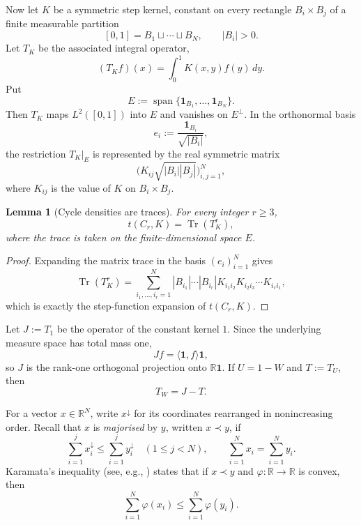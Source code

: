 \documentclass[11pt]{article}
\newtheorem{lemma}[theorem]{Lemma}
\theoremstyle{definition}
\theoremstyle{remark}
\newcommand{\R}{\mathbb{R}}
\newcommand{\one}{\mathbf{1}}
\newcommand{\tr}{\operatorname{Tr}}
\begin{document}
Now let $K$ be a symmetric step kernel, constant on every rectangle
$B_i\times B_j$ of a finite measurable partition
\[
  [0,1]=B_1\sqcup\cdots\sqcup B_N,
  \qquad |B_i|>0.
\]
Let $T_K$ be the associated integral operator,
\[
  (T_Kf)(x)=\int_0^1K(x,y)f(y)\,dy.
\]
Put
\[
  E:=\operatorname{span}\{\one_{B_1},\ldots,\one_{B_N}\}.
\]
Then $T_K$ maps $L^2([0,1])$ into $E$ and vanishes on $E^\perp$.  In the
orthonormal basis
\[
  e_i:=\frac{\one_{B_i}}{\sqrt{|B_i|}},
\]
the restriction $T_K|_E$ is represented by the real symmetric matrix
\[
  \bigl(K_{ij}\sqrt{|B_i||B_j|}\bigr)_{i,j=1}^N,
\]
where $K_{ij}$ is the value of $K$ on $B_i\times B_j$.

\begin{lemma}[Cycle densities are traces]
  \label{lem:trace-density}
  For every integer $r\ge3$,
  \begin{equation}
    t(C_r,K)=\tr(T_K^r),
    \label{eq:trace-density}
  \end{equation}
  where the trace is taken on the finite-dimensional space $E$.
\end{lemma}

\begin{proof}
  Expanding the matrix trace in the basis $(e_i)_{i=1}^N$ gives
  \[
    \tr(T_K^r)
    =
    \sum_{i_1,\ldots,i_r=1}^N
    |B_{i_1}|\cdots|B_{i_r}|
    K_{i_1i_2}K_{i_2i_3}\cdots K_{i_ri_1},
  \]
  which is exactly the step-function expansion of $t(C_r,K)$.
\end{proof}

Let $J:=T_1$ be the operator of the constant kernel $1$.  Since the underlying
measure space has total mass one,
\[
  Jf=\langle \one,f\rangle\one,
\]
so $J$ is the rank-one orthogonal projection onto $\R\one$.  If $U=1-W$ and
$T:=T_U$, then
\begin{equation}
  T_W=J-T.
  \label{eq:complement-operator}
\end{equation}

For a vector $x\in\R^N$, write $x^\downarrow$ for its coordinates rearranged
in nonincreasing order.  Recall that $x$ is \emph{majorised} by $y$, written
$x\prec y$, if
\[
  \sum_{i=1}^j x_i^\downarrow
  \le
  \sum_{i=1}^j y_i^\downarrow
  \quad(1\le j<N),
  \qquad
  \sum_{i=1}^N x_i=\sum_{i=1}^N y_i.
\]
Karamata's inequality (see, e.g., \cite[Chapter~4]{MOA}) states that if
$x\prec y$ and $\varphi\colon\R\to\R$ is convex, then
\begin{equation}
  \sum_{i=1}^N\varphi(x_i)
  \le
  \sum_{i=1}^N\varphi(y_i).
  \label{eq:karamata}
\end{equation}
\end{document}
